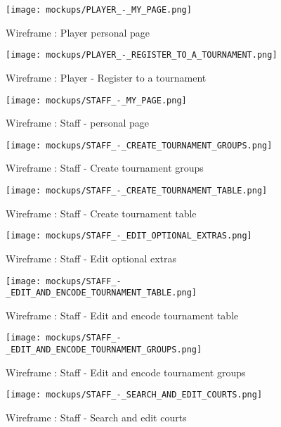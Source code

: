\begin{figure}[!ht]
    \centering
    \texttt{[image: mockups/PLAYER\_-\_MY\_PAGE.png]}
    \caption{Wireframe : Player personal page}
\end{figure}
\FloatBarrier

\begin{figure}[!ht]
    \centering
    \texttt{[image: mockups/PLAYER\_-\_REGISTER\_TO\_A\_TOURNAMENT.png]}
    \caption{Wireframe : Player - Register to a tournament}
\end{figure}
\FloatBarrier

\begin{figure}[!ht]
    \centering
    \texttt{[image: mockups/STAFF\_-\_MY\_PAGE.png]}
    \caption{Wireframe : Staff - personal page}
\end{figure}
\FloatBarrier

\begin{figure}[!ht]
    \centering
    \texttt{[image: mockups/STAFF\_-\_CREATE\_TOURNAMENT\_GROUPS.png]}
    \caption{Wireframe : Staff - Create tournament groups}
\end{figure}
\FloatBarrier

\begin{figure}[!ht]
    \centering
    \texttt{[image: mockups/STAFF\_-\_CREATE\_TOURNAMENT\_TABLE.png]}
    \caption{Wireframe : Staff - Create tournament table}
\end{figure}
\FloatBarrier

\begin{figure}[!ht]
    \centering
    \texttt{[image: mockups/STAFF\_-\_EDIT\_OPTIONAL\_EXTRAS.png]}
    \caption{Wireframe : Staff - Edit optional extras}
\end{figure}
\FloatBarrier

\begin{figure}[!ht]
    \centering
    \texttt{[image: mockups/STAFF\_-\_EDIT\_AND\_ENCODE\_TOURNAMENT\_TABLE.png]}
    \caption{Wireframe : Staff - Edit and encode tournament table}
\end{figure}
\FloatBarrier

\begin{figure}[!ht]
    \centering
    \texttt{[image: mockups/STAFF\_-\_EDIT\_AND\_ENCODE\_TOURNAMENT\_GROUPS.png]}
    \caption{Wireframe : Staff - Edit and encode tournament groups}
\end{figure}
\FloatBarrier

\begin{figure}[!ht]
    \centering
    \texttt{[image: mockups/STAFF\_-\_SEARCH\_AND\_EDIT\_COURTS.png]}
    \caption{Wireframe : Staff - Search and edit courts}
\end{figure}
\FloatBarrier

